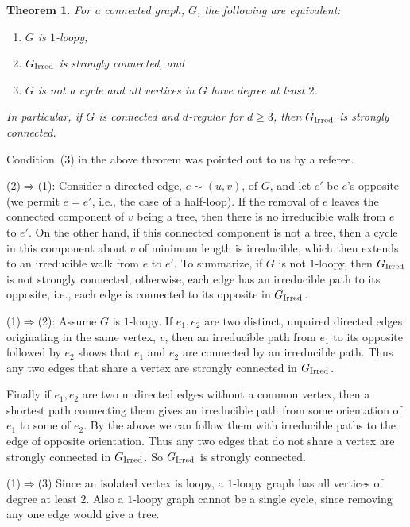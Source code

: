 \documentclass[12pt]{article}
\newtheorem{theorem}{Theorem}[section]
\newcommand{\proof}{{\par\noindent {\bf Proof}\space\space}}
\newcommand{\ird}[1]{{\rm Irred}_{#1}}
\begin{document}
\begin{theorem}\label{th:loopy}
For a connected graph, $G$, the following are equivalent:
\begin{enumerate}
\item $G$ is $1$-loopy,
\item $G_{\ird{}}$ is strongly connected, and
\item $G$ is not a cycle and all vertices in $G$ have degree at least $2$.
\end{enumerate}
In particular, if $G$ is connected
and $d$-regular for $d\ge 3$, then $G_{\ird{}}$ is strongly connected.
\end{theorem}
Condition~(3) in the above theorem was pointed out to us by a referee.
\proof 
(2)$\Rightarrow$(1):
Consider a directed edge, $e\sim(u,v)$, of $G$, and let $e'$ be
$e$'s opposite (we permit $e=e'$, i.e., the case of a half-loop).
If the removal
of $e$ leaves the connected component of $v$ being a tree, then there is
no irreducible walk from $e$ to $e'$.  On the other hand, if this
connected component is not a tree, then a cycle in this component
about $v$ of minimum
length is irreducible, which then extends to an irreducible walk from
$e$ to $e'$.  To summarize, if $G$ is not $1$-loopy, then $G_{\ird{}}$
is not strongly connected; otherwise, each edge has an irreducible
path to its opposite, i.e., each edge is connected to its opposite
in $G_{\ird{}}$.

(1)$\Rightarrow$(2):
Assume $G$ is $1$-loopy.
If $e_1,e_2$ are two distinct, unpaired
directed edges originating in the same vertex,
$v$, then an irreducible path from $e_1$ to its opposite followed by
$e_2$ shows that $e_1$ and $e_2$ are connected by an irreducible path.
Thus any two edges that share a vertex are strongly
connected in $G_{\ird{}}$.

Finally if $e_1,e_2$ are two undirected edges without a common vertex,
then a shortest path connecting them gives an irreducible path
from some orientation of $e_1$ to some of $e_2$.  By the above we can
follow them with irreducible paths to the edge of opposite orientation.
Thus any two edges that do not share a vertex are strongly
connected in $G_{\ird{}}$.
So $G_{\ird{}}$ is strongly connected.

(1)$\Rightarrow$(3)
Since an isolated vertex is loopy, a $1$-loopy graph has all vertices
of degree at least $2$.  Also a $1$-loopy graph cannot be a single cycle,
since removing any one edge would give a tree.
\end{document}
